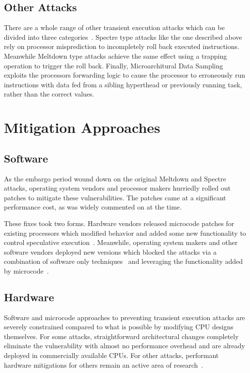 \subsection{Other Attacks}
There are a whole range of other transient execution attacks which can be divided into three categories~\cite{hill:survey}.
Spectre type attacks like the one described above rely on processor misprediction to incompletely roll back executed instructions.
Meanwhile Meltdown type attacks achieve the same effect using a trapping operation to trigger the roll back.
Finally, Microarchitural Data Sampling exploits the processors forwarding logic to cause the processor to erroneously run instructions with data fed from a sibling hyperthead or previously running task, rather than the correct values.

\section{Mitigation Approaches}
\subsection{Software}
As the embargo period wound down on the original Meltdown and Spectre attacks, operating system vendors and processor makers hurriedly rolled out patches to mitigate these vulnerabilities.
The patches came at a significant performance cost, as was widely commented on at the time. 

These fixes took two forms.
Hardware vendors released microcode patches for existing processors which modified behavior and added some new functionality to control speculative execution~\cite{intel:l1tf}.
Meanwhile, operating system makers and other software vendors deployed new versions which blocked the attacks via a combination of software only techniques~\cite{intel:retpoline, linux:kpti} and leveraging the functionality added by microcode~\cite{intel:l1tf}.

\subsection{Hardware}
Software and microcode approaches to preventing transient execution attacks are severely constrained compared to what is possible by modifying CPU designs themselves.
For some attacks, straightforward architectural changes completely eliminate the vulnerability with almost no performance overhead and are already deployed in commercially available CPUs.
For other attacks, performant hardware mitigations for others remain an active area of research~\cite{OISA, ConTExT}.

